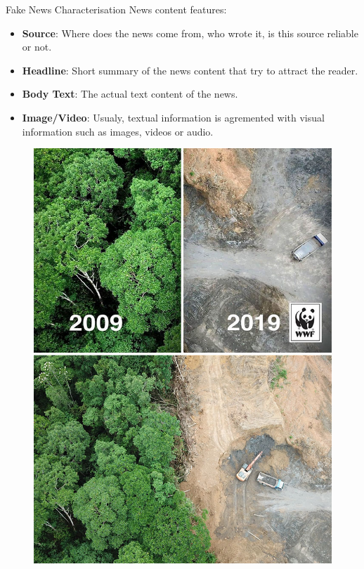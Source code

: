 \documentclass{beamer}
\begin{document}
  \begin{frame}[allowframebreaks]{Fake News Characterisation}
News content features:
  	\begin{itemize}
		 \item \textbf{Source}: Where does the news come from, who wrote it, is this source reliable or not.
		 \item \textbf{Headline}: Short summary of the news content that try to attract the reader.
		 \item \textbf{Body Text}: The actual text content of the news.
		 \item \textbf{Image/Video}: Usualy, textual information is agremented with visual information such as images, videos or audio.  
		\end{itemize}
	\note{}
	\newpage
	\vfill
	\begin{figure}
		 \includegraphics[scale=0.20]{fake-news-photos-viral-photoshop-8-5c6fe61f88240__700}

\end{figure}
\end{frame}
\end{document}
